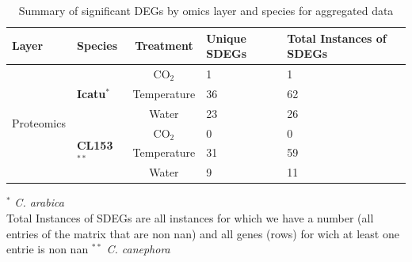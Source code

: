 \begin{table}
\centering
\caption{Summary of significant DEGs by omics layer and species for aggregated data}
\label{tab:deg_prot_summary}
\begin{tabularx}{\textwidth}{@{}llcXX@{}}
\toprule
Layer & Species & Treatment & Unique SDEGs & Total Instances of SDEGs \\
\midrule
\multirow{6}{*}{Proteomics}
    & \multirow{3}{*}{\textbf{Icatu}$^{*}$}
        & CO$_2$       & 1 & 1 \\
    &   & Temperature & 36 & 62 \\
    &   & Water       & 23 & 26 \\
    \cmidrule(l){2-5}
    & \multirow{3}{*}{\textbf{CL153}$^{**}$}
        & CO$_2$       & 0 & 0 \\
    &   & Temperature & 31 & 59 \\
    &   & Water       & 9 & 11 \\
\bottomrule
\end{tabularx}
\vspace{0.5em}
\footnotesize
$^{*}$ \textit{C. arabica}\\ Total Instances of SDEGs are all instances for which we have a number (all entries of the matrix that are non nan) and all genes (rows) for wich at least one entrie is non nan
$^{**}$ \textit{C. canephora}
\end{table}
